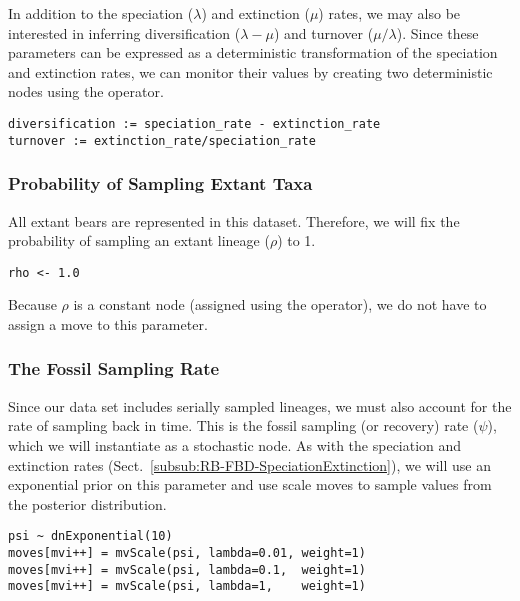In addition to the speciation ($\lambda$) and extinction ($\mu$) rates, we may also be interested in inferring diversification ($\lambda - \mu$) and turnover ($\mu/\lambda$). Since these parameters can be expressed as a deterministic transformation of the speciation and extinction rates, we can monitor their values by creating two deterministic nodes using the \cl{:=} operator.
{\tt \begin{snugshade*}
\begin{lstlisting}
diversification := speciation_rate - extinction_rate
turnover := extinction_rate/speciation_rate
\end{lstlisting}
\end{snugshade*}}

\subsubsection{Probability of Sampling Extant Taxa}\label{subsub:RB-FBD-Rho}

All extant bears are represented in this dataset. 
Therefore, we will fix the probability of sampling an extant lineage ($\rho$) to 1.
{\tt \begin{snugshade*}
\begin{lstlisting}
rho <- 1.0
\end{lstlisting}
\end{snugshade*}}
Because $\rho$ is a constant node (assigned using the \cl{<-} operator), we do not have to assign a move to this parameter.

\subsubsection{The Fossil Sampling Rate}\label{subsub:RB-FBD-Psi}

Since our data set includes serially sampled lineages, we must also account for the rate of sampling back in time. 
This is the fossil sampling (or recovery) rate ($\psi$), which we will instantiate as a stochastic node. 
As with the speciation and extinction rates (Sect.\ \ref{subsub:RB-FBD-SpeciationExtinction}), we will use an exponential prior on this parameter and use scale moves to sample values from the posterior distribution.
{\tt \begin{snugshade*}
\begin{lstlisting}
psi ~ dnExponential(10) 
moves[mvi++] = mvScale(psi, lambda=0.01, weight=1)
moves[mvi++] = mvScale(psi, lambda=0.1,  weight=1)
moves[mvi++] = mvScale(psi, lambda=1,    weight=1)
\end{lstlisting}
\end{snugshade*}}

